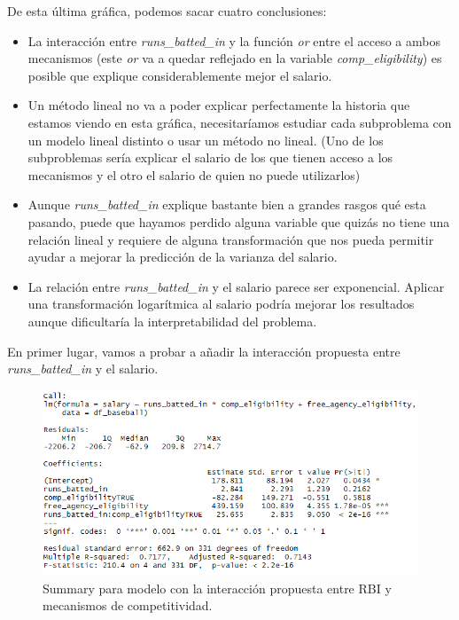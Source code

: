 \documentclass[a4paper,12pt, oneside]{book}
\begin{document}
De esta última gráfica, podemos sacar cuatro conclusiones:
\begin{itemize}
	\item La interacción entre \textit{runs\_batted\_in} y la función \textit{or} entre el acceso a ambos mecanismos (este \textit{or} va a quedar reflejado en la variable \textit{comp\_eligibility}) es posible que explique considerablemente mejor el salario.
	\item Un método lineal no va a poder explicar perfectamente la historia que estamos viendo en esta gráfica, necesitaríamos estudiar cada subproblema con un modelo lineal distinto o usar un método no lineal. (Uno de los subproblemas sería explicar el salario de los que tienen acceso a los mecanismos y el otro el salario de quien no puede utilizarlos)
	\item Aunque \textit{runs\_batted\_in} explique bastante bien a grandes rasgos qué esta pasando, puede que hayamos perdido alguna variable que quizás no tiene una relación lineal y requiere de alguna transformación que nos pueda permitir ayudar a mejorar la predicción de la varianza del salario.
	\item La relación entre \textit{runs\_batted\_in} y el salario parece ser exponencial. Aplicar una transformación logarítmica al salario podría mejorar los resultados aunque dificultaría la interpretabilidad del problema.
\end{itemize}

En primer lugar, vamos a probar a añadir la interacción propuesta entre \textit{runs\_batted\_in} y el salario.\\

\begin{figure}[H]
\centering
\includegraphics[scale=0.7]{images/multifitinter1.png}
\caption{Summary para modelo con la interacción propuesta entre RBI y mecanismos de competitividad.}
\end{figure}
\end{document}
